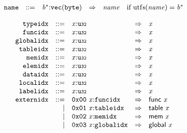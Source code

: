 $$
\begin{array}{@{}l@{}rrlll@{}l@{}}
& {\mathtt{name}} &::=& {{\mathit{b}}^\ast}{:}{\mathtt{vec}}({\mathtt{byte}}) &\Rightarrow& {\mathit{name}} &\quad
  \mbox{if}~{\mathrm{utf{\scriptstyle8}}}({\mathit{name}}) = {{\mathit{b}}^\ast} \\
\end{array}
$$

\vspace{1ex}

$$
\begin{array}{@{}l@{}rrlll@{}l@{}}
& {\mathtt{typeidx}} &::=& {\mathit{x}}{:}{\mathtt{u{\scriptstyle32}}} &\Rightarrow& {\mathit{x}} \\
& {\mathtt{funcidx}} &::=& {\mathit{x}}{:}{\mathtt{u{\scriptstyle32}}} &\Rightarrow& {\mathit{x}} \\
& {\mathtt{globalidx}} &::=& {\mathit{x}}{:}{\mathtt{u{\scriptstyle32}}} &\Rightarrow& {\mathit{x}} \\
& {\mathtt{tableidx}} &::=& {\mathit{x}}{:}{\mathtt{u{\scriptstyle32}}} &\Rightarrow& {\mathit{x}} \\
& {\mathtt{memidx}} &::=& {\mathit{x}}{:}{\mathtt{u{\scriptstyle32}}} &\Rightarrow& {\mathit{x}} \\
& {\mathtt{elemidx}} &::=& {\mathit{x}}{:}{\mathtt{u{\scriptstyle32}}} &\Rightarrow& {\mathit{x}} \\
& {\mathtt{dataidx}} &::=& {\mathit{x}}{:}{\mathtt{u{\scriptstyle32}}} &\Rightarrow& {\mathit{x}} \\
& {\mathtt{localidx}} &::=& {\mathit{x}}{:}{\mathtt{u{\scriptstyle32}}} &\Rightarrow& {\mathit{x}} \\
& {\mathtt{labelidx}} &::=& {\mathit{x}}{:}{\mathtt{u{\scriptstyle32}}} &\Rightarrow& {\mathit{x}} \\
& {\mathtt{externidx}} &::=& \mathtt{0x00}~{\mathit{x}}{:}{\mathtt{funcidx}} &\Rightarrow& \mathsf{func}~{\mathit{x}} \\ &&|&
\mathtt{0x01}~{\mathit{x}}{:}{\mathtt{tableidx}} &\Rightarrow& \mathsf{table}~{\mathit{x}} \\ &&|&
\mathtt{0x02}~{\mathit{x}}{:}{\mathtt{memidx}} &\Rightarrow& \mathsf{mem}~{\mathit{x}} \\ &&|&
\mathtt{0x03}~{\mathit{x}}{:}{\mathtt{globalidx}} &\Rightarrow& \mathsf{global}~{\mathit{x}} \\
\end{array}
$$

\vspace{1ex}

